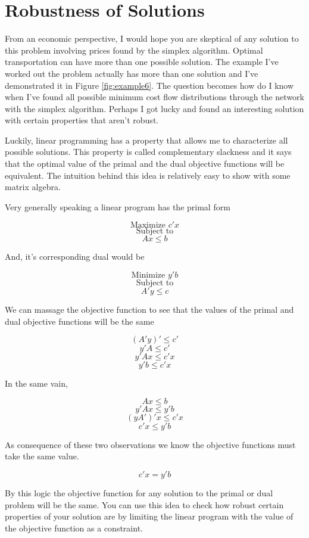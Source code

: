 \documentclass{report}
\begin{document}
\section{Robustness of Solutions}

From an economic perspective, I would hope you are skeptical of any solution to this problem involving prices found by the simplex algorithm. Optimal transportation can have more than one possible solution. The example I've worked out the problem actually has more than one solution and I've demonstrated it in Figure \ref{fig:example6}. The question becomes how do I know when I've found all possible minimum cost flow distributions through the network with the simplex algorithm. Perhaps I got lucky and found an interesting solution with certain properties that aren't robust.

Luckily, linear programming has a property that allows me to characterize all possible solutions. This property is called complementary slackness and it says that the optimal value of the primal and the dual objective functions will be equivalent. The intuition behind this idea is relatively easy to show with some matrix algebra.

Very generally speaking a linear program has the primal form

$$\text{Maximize } c' x$$
$$\text{Subject to}$$
$$Ax \leq b$$

And, it's corresponding dual would be

$$\text{Minimize } y' b$$
$$\text{Subject to}$$
$$A'y \leq c$$

We can massage the objective function to see that the values of the primal and dual objective functions will be the same

$$(A'y)' \leq c'$$
$$ y'A \leq c'$$
$$ y'Ax \leq c'x$$
$$y' b \leq c'x$$

In the same vain, 

$$ Ax \leq b$$
$$ y'Ax \leq y'b$$
$$ (yA')'x \leq c'x$$
$$ c'x \leq  y' b $$

As consequence of these two observations we know the objective functions must take the same value.

$$c'x = y' b$$

By this logic the objective function for any solution to the primal or dual problem will be the same. You can use this idea to check how robust certain properties of your solution are by limiting the linear program with the value of the objective function as a constraint. 
\end{document}
